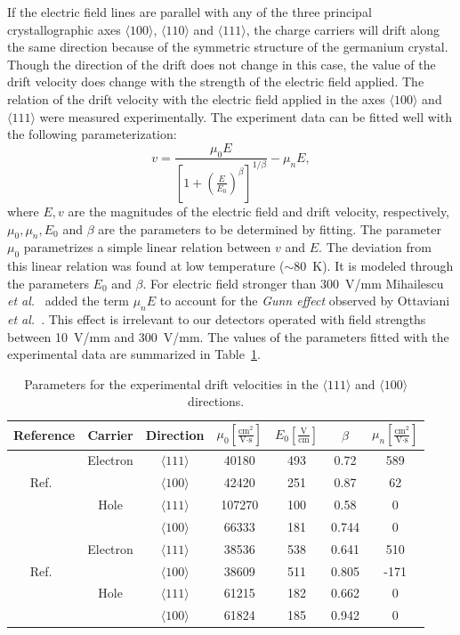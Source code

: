 If the electric field lines are parallel with any of the three principal crystallographic axes $\langle100\rangle$, $\langle110\rangle$ and $\langle111\rangle$, the charge carriers will drift along the same direction because of the symmetric structure of the germanium crystal. Though the direction of the drift does not change in this case, the value of the drift velocity does change with the strength of the electric field applied. The relation of the drift velocity with the electric field applied in the axes $\langle100\rangle$ and $\langle111\rangle$ were measured experimentally. The experiment data can be fitted well with the following parameterization:
\begin{equation}
  \label{eq:pss:para}
  v = \frac{\mu_{0}E}{[1+(\frac{E}{E_{0}})^{\beta}]^{1/\beta}} -   \mu_{n}E,
\end{equation}
where $E, v$ are the magnitudes of the electric field and drift velocity, respectively, $\mu_{0}, \mu_{n}, E_{0}$ and $\beta$ are the parameters to be determined by fitting. The parameter $\mu_{0}$ parametrizes a simple linear relation between $v$ and $E$. The deviation from this linear relation was found at low temperature ($\sim$80~K). It is modeled through the parameters $E_{0}$ and $\beta$. For electric field stronger than 300~V/mm Mihailescu \textit{et al.}~\cite{miha} added the term $\mu_{n}E$ to account for the \emph{Gunn effect} observed by Ottaviani \textit{et al.}~\cite{otta}. This effect is irrelevant to our detectors operated with field strengths between 10~V/mm and 300~V/mm. The values of the parameters fitted with the experimental data are summarized in Table~\ref{tab:pss:pars}. 

\begin{table}[tbhp]
\centering
\caption{Parameters for the experimental drift velocities in the $\langle111\rangle$ and $\langle100\rangle$ directions.}
\label{tab:pss:pars}
\begin{tabular*}{\textwidth}{ccccccc}\hline\hline
Reference & Carrier & Direction & $\mu_{0} \left[ \frac{\mbox{cm}^{2}}{\mbox{V}\cdot\mbox{s}} \right]$ & $E_{0} \left[ \frac{\mbox{V}}{\mbox{cm}} \right]$ & $\beta$ & $\mu_{n} \left[ \frac{\mbox{cm}^{2}}{\mbox{V}\cdot\mbox{s}} \right]$ \\\hline
& Electron & $\langle111\rangle$ & 40180 & 493 & 0.72 & 589 \\
Ref.~\cite{miha}& & $\langle100\rangle$ & 42420 & 251 & 0.87 & 62\\
& Hole & $\langle111\rangle$ & 107270 & 100 & 0.58 & 0 \\
& & $\langle100\rangle$ & 66333 & 181 & 0.744 & 0 \\\hline
& Electron & $\langle111\rangle$ & 38536 & 538 & 0.641 & 510 \\
Ref.~\cite{bart}& & $\langle100\rangle$ & 38609 & 511 & 0.805 & -171\\ 
& Hole & $\langle111\rangle$ & 61215 & 182 & 0.662 & 0 \\
& & $\langle100\rangle$ & 61824 & 185 & 0.942 & 0 \\\hline\hline
\end{tabular*}
\end{table}

